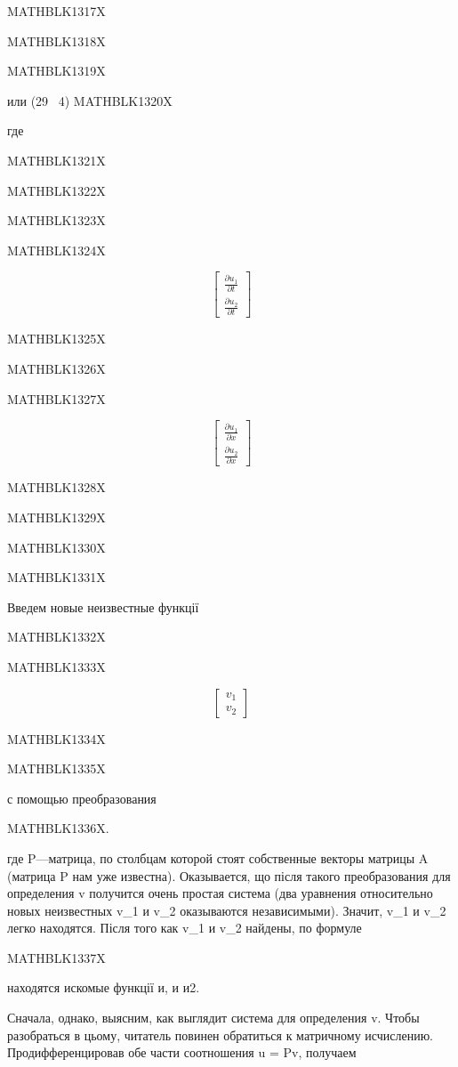 \documentclass[
  ukrainian,
]{article}
\begin{document}
MATHBLK1317X

MATHBLK1318X

MATHBLK1319X

или (29 ~4) MATHBLK1320X

где

MATHBLK1321X

MATHBLK1322X

MATHBLK1323X

MATHBLK1324X

\[
\begin{bmatrix} \frac{\partial u_1}{\partial t} \\ \frac{\partial u_2}{\partial t} \end{bmatrix}
\]

MATHBLK1325X

MATHBLK1326X

MATHBLK1327X

\[
\begin{bmatrix} \frac{\partial u_1}{\partial x} \\ \frac{\partial u_2}{\partial x} \end{bmatrix}
\]

MATHBLK1328X

MATHBLK1329X

MATHBLK1330X

MATHBLK1331X

Введем новые неизвестные функції

MATHBLK1332X

MATHBLK1333X

\[
\begin{bmatrix} v_1 \\ v_2 \end{bmatrix}
\]

MATHBLK1334X

MATHBLK1335X

с помощью преобразования

MATHBLK1336X.

где P---матрица, по столбцам которой стоят собственные векторы матрицы A
(матрица P нам уже известна). Оказывается, що після такого
преобразования для определения v получится очень простая система (два
уравнения относительно новых неизвестных v\_1 и v\_2 оказываются
независимыми). Значит, v\_1 и v\_2 легко находятся. Після того как v\_1
и v\_2 найдены, по формуле

MATHBLK1337X

находятся искомые функції и, и и2.

Сначала, однако, выясним, как выглядит система для определения v. Чтобы
разобраться в цьому, читатель повинен обратиться к матричному
исчислению. Продифференцировав обе части соотношения u = Pv, получаем
\end{document}
